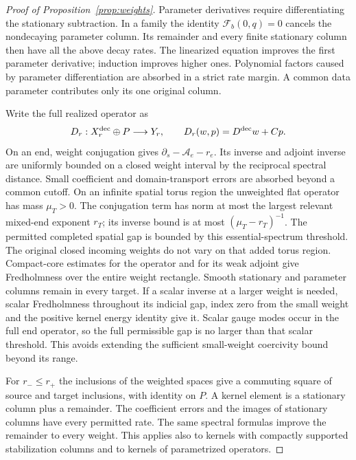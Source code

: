 \documentclass[11pt]{amsart}
\theoremstyle{definition}
\theoremstyle{remark}
\theoremstyle{plain}
\numberwithin{equation}{section}
\begin{document}
\begin{proof}[Proof of Proposition~\ref{prop:weights}]
Parameter derivatives require differentiating the stationary
subtraction. In a family the identity $\mathcal F_b(0,q)=0$
cancels the nondecaying parameter column. Its remainder and every
finite stationary column then have all the above decay rates.
The linearized equation improves the first parameter derivative;
induction improves higher ones. Polynomial factors caused by
parameter differentiation are absorbed in a strict rate margin.
A common data parameter contributes only its one original column.

Write the full realized operator as
\[
 D_r:X_r^{\rm dec}\oplus P\longrightarrow Y_r,
 \qquad D_r(w,p)=D^{\rm dec}w+C p.
\]
On an end, weight conjugation gives
$\partial_s-\mathcal A_e-r_e$. Its inverse and adjoint inverse
are uniformly bounded on a closed weight interval by the reciprocal
spectral distance. Small coefficient and domain-transport errors
are absorbed beyond a common cutoff. On an infinite spatial torus
region the unweighted flat operator has mass $\mu_T>0$. The
conjugation term has norm at most the largest relevant mixed-end
exponent $r_T$; its inverse bound is at most
$(\mu_T-r_T)^{-1}$. The permitted completed spatial gap is bounded
by this essential-spectrum threshold. The original closed incoming
weights do not vary on that added torus region. Compact-core
estimates for the operator and for its weak adjoint give
Fredholmness over the entire weight rectangle. Smooth stationary and
parameter columns remain in every target. If a scalar inverse at a
larger weight is needed, scalar Fredholmness throughout its indicial
gap, index zero from the small weight and the positive kernel energy
identity give it. Scalar gauge modes occur in the full end operator,
so the full permissible gap is no larger than that scalar threshold.
This avoids extending the sufficient small-weight coercivity bound
beyond its range.

For $r_-\leq r_+$ the inclusions of the weighted spaces give a
commuting square of source and target inclusions, with identity
on $P$. A kernel element is a stationary column plus a remainder.
The coefficient errors and the images of stationary columns have
every permitted rate. The same spectral formulas improve the
remainder to every weight. This applies also to kernels with
compactly supported stabilization columns and to kernels of
parametrized operators.


\end{proof}
\end{document}
